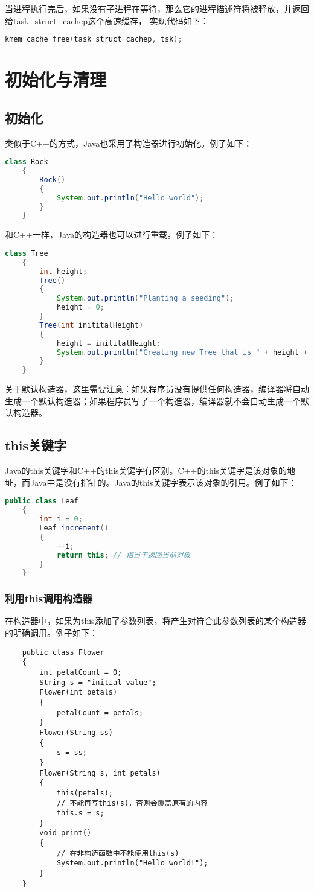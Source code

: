 \documentclass[a4paper,left=2.5cm,right=2.5cm,11pt]{article}
\begin{document}
	当进程执行完后，如果没有子进程在等待，那么它的进程描述符将被释放，并返回给task\_struct\_cachep这个高速缓存，
	实现代码如下：
	\begin{lstlisting}[language = C]
	kmem_cache_free(task_struct_cachep, tsk);
	\end{lstlisting}

\clearpage

\section{初始化与清理}
\subsection{初始化}
	类似于C++的方式，Java也采用了构造器进行初始化。例子如下：
	\begin{lstlisting}[language = Java]
	class Rock
	{
		Rock()
		{
			System.out.println("Hello world");
		}
	}
	\end{lstlisting}

	和C++一样，Java的构造器也可以进行重载。例子如下：
	\begin{lstlisting}[language = Java]
	class Tree
	{
		int height;
		Tree()
		{
			System.out.println("Planting a seeding");
			height = 0;
		}
		Tree(int inititalHeight)
		{
			height = inititalHeight;
			System.out.println("Creating new Tree that is " + height + " feer tall");
		}
	}
	\end{lstlisting}

	关于默认构造器，这里需要注意：如果程序员没有提供任何构造器，编译器将自动生成一个默认构造器；如果程序员写了一个构造器，编译器就不会自动生成一个默认构造器。

\subsection{this关键字}
	Java的this关键字和C++的this关键字有区别。C++的this关键字是该对象的地址，而Java中是没有指针的。Java的this关键字表示该对象的引用。例子如下：
	\begin{lstlisting}[language = Java]
	public class Leaf
	{
		int i = 0;
		Leaf increment()
		{
			++i;
			return this; // 相当于返回当前对象
		}
	}
	\end{lstlisting}
\subsubsection{利用this调用构造器}
	在构造器中，如果为this添加了参数列表，将产生对符合此参数列表的某个构造器的明确调用。例子如下：
	\begin{lstlisting}
	public class Flower
	{
		int petalCount = 0;
		String s = "initial value";
		Flower(int petals)
		{
			petalCount = petals;
		}
		Flower(String ss)
		{
			s = ss;
		}
		Flower(String s, int petals)
		{
			this(petals);
			// 不能再写this(s)，否则会覆盖原有的内容
			this.s = s;
		}
		void print()
		{
			// 在非构造函数中不能使用this(s)
			System.out.println("Hello world!");
		}
	}
	\end{lstlisting}
\end{document}
